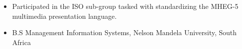 %
%
%

\twocolumnsection
{
\begin{itemize}
  \item Participated in the ISO sub-group tasked with standardizing the MHEG-5
  multimedia presentation language.
\end{itemize}}
{
\begin{itemize}
  \item B.S Management Information Systems, Nelson Mandela University, South
  Africa
\end{itemize}}
